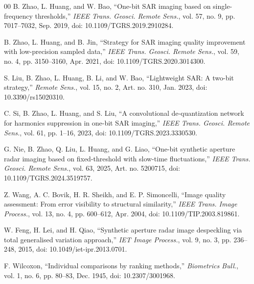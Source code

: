 \documentclass[conference]{IEEEtran}
\begin{document}
\begin{thebibliography}{00}
B. Zhao, L. Huang, and W. Bao, ``One-bit SAR imaging based on single-frequency thresholds,'' \textit{IEEE Trans. Geosci. Remote Sens.}, vol. 57, no. 9, pp. 7017--7032, Sep. 2019, doi: 10.1109/TGRS.2019.2910284.

B. Zhao, L. Huang, and B. Jin, ``Strategy for SAR imaging quality improvement with low-precision sampled data,'' \textit{IEEE Trans. Geosci. Remote Sens.}, vol. 59, no. 4, pp. 3150--3160, Apr. 2021, doi: 10.1109/TGRS.2020.3014300.

S. Liu, B. Zhao, L. Huang, B. Li, and W. Bao, ``Lightweight SAR: A two-bit strategy,'' \textit{Remote Sens.}, vol. 15, no. 2, Art. no. 310, Jan. 2023, doi: 10.3390/rs15020310.

C. Si, B. Zhao, L. Huang, and S. Liu, ``A convolutional de-quantization network for harmonics suppression in one-bit SAR imaging,'' \textit{IEEE Trans. Geosci. Remote Sens.}, vol. 61, pp. 1--16, 2023, doi: 10.1109/TGRS.2023.3330530.

G. Nie, B. Zhao, Q. Liu, L. Huang, and G. Liao, ``One-bit synthetic aperture radar imaging based on fixed-threshold with slow-time fluctuations,'' \textit{IEEE Trans. Geosci. Remote Sens.}, vol. 63, 2025, Art. no. 5200715, doi: 10.1109/TGRS.2024.3519757.

Z. Wang, A. C. Bovik, H. R. Sheikh, and E. P. Simoncelli, ``Image quality assessment: From error visibility to structural similarity,'' \textit{IEEE Trans. Image Process.}, vol. 13, no. 4, pp. 600--612, Apr. 2004, doi: 10.1109/TIP.2003.819861.

W. Feng, H. Lei, and H. Qiao, ``Synthetic aperture radar image despeckling via total generalised variation approach,'' \textit{IET Image Process.}, vol. 9, no. 3, pp. 236--248, 2015, doi: 10.1049/iet-ipr.2013.0701.

F. Wilcoxon, ``Individual comparisons by ranking methods,'' \textit{Biometrics Bull.}, vol. 1, no. 6, pp. 80--83, Dec. 1945, doi: 10.2307/3001968.

\end{thebibliography}
\end{document}
